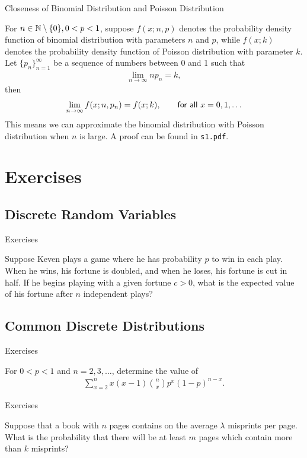 \begin{frame}{Closeness of Binomial Distribution and Poisson Distribution}

\justifying
{} For $n\in \mathbb{N}\setminus\{0\}, 0 < p < 1$, suppose $f(x; n, p)$ denotes the probability density function of binomial distribution with parameters $n$ and $p$, while $f(x; k)$ denotes the probability density function of Poisson distribution with parameter $k$. Let $\{p_n\}_{n=1}^{\infty}$ be a sequence of numbers between 0 and 1 such that
\begin{align*}
\lim_{n\rightarrow\infty} np_n = k,
\end{align*}
then
\begin{align*}
\lim_{n\rightarrow \infty} f(x; n, p_n) = f(x; k), \qquad \mathsf{for\ all\ } x = 0, 1, \ldots
\end{align*}
This means we can approximate the binomial distribution with Poisson distribution when $n$ is large. A proof can be found in \texttt{s1.pdf}.

\end{frame}


\section{Exercises}

\subsection{Discrete Random Variables}

\begin{frame}{Exercises}

\justifying
{} Suppose Keven plays a game where he has probability $p$ to win in each play. When he wins, his fortune is doubled, and when he loses, his fortune is cut in half. If he begins playing with a given fortune $c > 0$, what is the expected value of his fortune after $n$ independent plays?

\end{frame}

\subsection{Common Discrete Distributions}


\begin{frame}{Exercises}

\justifying
{} For $0 < p < 1$ and $n = 2, 3, \ldots$, determine the value of
\begin{align*}
\sum_{x=2}^n x(x-1)\binom{n}{x} p^x(1-p)^{n-x}.
\end{align*}

\end{frame}


\begin{frame}{Exercises}

\justifying
{} Suppose that a book with $n$ pages contains on the average $\lambda$ misprints per page. What is the probability that there will be at least $m$ pages which contain more than $k$ misprints?

\end{frame}
